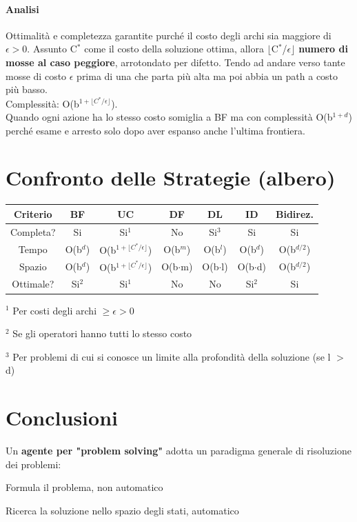 \documentclass[10pt]{book}
\begin{document}
\paragraph{Analisi} Ottimalità e completezza garantite purché il costo degli archi sia maggiore di $\epsilon > 0$. Assunto C$^*$ come il costo della soluzione ottima, allora $\lfloor$C$^*$/$\epsilon\rfloor$ \textbf{numero di mosse al caso peggiore}, arrotondato per difetto. Tendo ad andare verso tante mosse di costo $\epsilon$ prima di una che parta più alta ma poi abbia un path a costo più basso.\\
Complessità: O(b$^{1 + \lfloor C^*/\epsilon\rfloor}$).\\
Quando ogni azione ha lo stesso costo somiglia a BF ma con complessità O(b$^{1 + d}$) perché esame e arresto solo dopo aver espanso anche l'ultima frontiera.
\section{Confronto delle Strategie (albero)}
\begin{center}
\begin{tabular}{c | c | c | c | c | c | c}
Criterio & \textbf{BF} & \textbf{UC} & \textbf{DF} & \textbf{DL} & \textbf{ID} & Bidirez. \\
\hline
Completa? & Si & Si$^1$ & No & Si$^3$ & Si & Si \\
Tempo & O(b$^d$) & O(b$^{1 + \lfloor C^*/\epsilon\rfloor}$) & O(b$^m$) & O(b$^l$) & O(b$^d$) & O(b$^{d/2}$) \\
Spazio & O(b$^d$) & O(b$^{1 + \lfloor C^*/\epsilon\rfloor}$) & O(b$\cdot$m) & O(b$\cdot$l) & O(b$\cdot$d) & O(b$^{d/2}$)\\
Ottimale? & Si$^2$ & Si$^1$ & No & No & Si$^2$ & Si
\end{tabular}
\end{center}
\begin{list}{}{}
	\item $^1$ Per costi degli archi $\geq\epsilon > 0$
	\item $^2$ Se gli operatori hanno tutti lo stesso costo
	\item $^3$ Per problemi di cui si conosce un limite alla profondità della soluzione (se l $>$ d)
\end{list}
\section{Conclusioni}
Un \textbf{agente per "problem solving"} adotta un paradigma generale di risoluzione dei problemi:
\begin{list}{}{}
	\item Formula il problema, non automatico
	\item Ricerca la soluzione nello spazio degli stati, automatico
\end{list}
\end{document}
